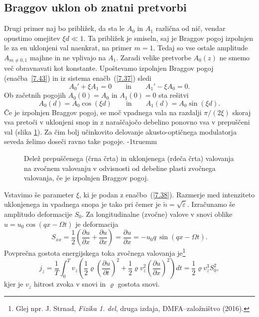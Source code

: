 \subsection*{Braggov uklon ob znatni pretvorbi}
Drugi primer naj bo približek, da sta le $A_{0}$ in $A_{1}$ različna od nič, 
vendar opustimo omejitev $\xi d\ll 1$. Ta približek je smiseln, saj je 
Braggov pogoj izpolnjen le za en uklonjeni val naenkrat, na
primer $m=1$. Tedaj so vse ostale amplitude $A_{m\ne0,1}$
majhne in ne vplivajo na $A_{1}$. Zaradi velike pretvorbe 
$A_{0}(z)$ ne smemo več obravnavati kot konstante. Upoštevamo 
izpolnjen Braggov pogoj (enačba~\ref{7.43}) in iz sistema enačb~(\ref{7.37})
sledi
\begin{equation}
A_{0}'+\xi A_{1}  =  0 \qquad \mathrm{in} \qquad A_{1}'-\xi A_{0} =  0.
\end{equation}
Ob začetnih pogojih $A_{0}(0)=A_{0}$ in $A_{1}(0)=0$ sta rešitvi
\begin{equation}
A_{0}(d) = A_{0}\cos (\xi d) \qquad \mathrm{in} \qquad A_{1}(d) = A_{0}\sin (\xi d).
\end{equation}
Če je izpolnjen Braggov pogoj, se moč vpadnega vala na razdalji $\pi/(2\xi)$
skoraj vsa pretoči v uklonjeni snop in z naraščajočo debelino ponovno vsa v
prepuščeni val (slika \ref{s7.10}).
Za čim bolj učinkovito delovanje akusto-optičnega modulatorja seveda
želimo doseči ravno take pogoje.
\vglue-1truemm
\begin{figure}[ht]
\centering
\def\svgwidth{80truemm} 

\caption{Delež prepuščenega (črna črta) in uklonjenega (rdeča črta) 
valovanja na zvočnem valovanju v odvisnosti od debeline plasti zvočnega valovanja, če
je izpolnjen Braggov pogoj.}
\label{s7.10}
\end{figure}

Vstavimo še parameter $\xi$, ki je podan z enačbo~(\ref{7.38}).
Razmerje med intenziteto uklonjenega in vpadnega snopa je tako
pri čemer je $\tilde{n}=\sqrt{\tilde{\varepsilon}}$.
Izračunamo še amplitudo deformacije $S_0$. Za longitudinalne (zvočne) valove v snovi oblike 
$u = u_0 \cos(qx - \Omega t)$ je deformacija 
\begin{equation}
S_{xx} = \frac{1}{2}\left(\frac{\partial u}{\partial x}+ 
\frac{\partial u}{\partial x}\right) = \frac{\partial u}{\partial x} = - u_0 q\, \sin(qx - \Omega t).
\end{equation}
Povprečna gostota energijskega toka zvočnega valovanja je\footnote{Glej 
npr. J. Strnad, {\it Fizika 1. del}, druga izdaja, DMFA--založništvo (2016).}
\begin{equation}
j_{z}= \frac{1}{T}\int_0^T 
v_z \left(\frac{1}{2} \varrho \left(\frac{\partial u}{\partial t}\right)^2
+ \frac{1}{2} \varrho v_z^2\left(\frac{\partial u}{\partial x}\right)^2
\right) dt = \frac{1}{2} \varrho v_z^3 S_0^2,
\label{7.49}
\end{equation}
kjer je $v_z$ hitrost zvoka v snovi in $\varrho$ gostota snovi. 

